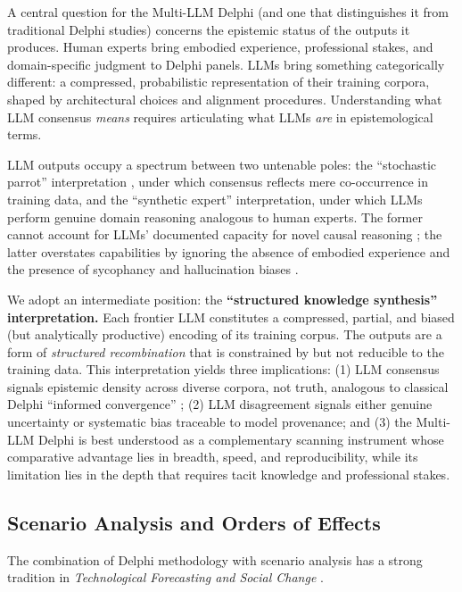 \documentclass[preprint,review,12pt]{elsarticle}
\begin{document}
A central question for the Multi-LLM Delphi (and one that distinguishes it from traditional Delphi studies) concerns the epistemic status of the outputs it produces. Human experts bring embodied experience, professional stakes, and domain-specific judgment to Delphi panels. LLMs bring something categorically different: a compressed, probabilistic representation of their training corpora, shaped by architectural choices and alignment procedures. Understanding what LLM consensus \textit{means} requires articulating what LLMs \textit{are} in epistemological terms.

LLM outputs occupy a spectrum between two untenable poles: the ``stochastic parrot'' interpretation \citep{bender2021parrots}, under which consensus reflects mere co-occurrence in training data, and the ``synthetic expert'' interpretation, under which LLMs perform genuine domain reasoning analogous to human experts. The former cannot account for LLMs' documented capacity for novel causal reasoning \citep{wei2022emergent, bubeck2023sparks}; the latter overstates capabilities by ignoring the absence of embodied experience and the presence of sycophancy and hallucination biases \citep{perez2023sycophancy, sharma2024sycophancy}.

We adopt an intermediate position: the \textbf{``structured knowledge synthesis'' interpretation.} Each frontier LLM constitutes a compressed, partial, and biased (but analytically productive) encoding of its training corpus. The outputs are a form of \textit{structured recombination} that is constrained by but not reducible to the training data. This interpretation yields three implications: (1) LLM consensus signals epistemic density across diverse corpora, not truth, analogous to classical Delphi ``informed convergence'' \citep{linstone1975delphi}; (2) LLM disagreement signals either genuine uncertainty or systematic bias traceable to model provenance; and (3) the Multi-LLM Delphi is best understood as a complementary scanning instrument whose comparative advantage lies in breadth, speed, and reproducibility, while its limitation lies in the depth that requires tacit knowledge and professional stakes.


\subsection{Scenario Analysis and Orders of Effects}
\label{sec:scenario_analysis}

The combination of Delphi methodology with scenario analysis has a strong tradition in \textit{Technological Forecasting and Social Change} \citep{culot2020manufacturing, fritschy2019autonomous, geels2020scenarios, banuls2011scenario}.
\end{document}
